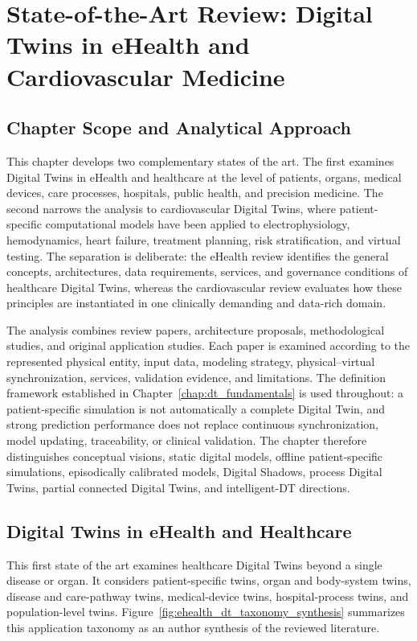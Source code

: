 \chapter{State-of-the-Art Review: Digital Twins in eHealth and Cardiovascular Medicine}

\section{Chapter Scope and Analytical Approach}
This chapter develops two complementary states of the art. The first examines Digital Twins in eHealth and healthcare at the level of patients, organs, medical devices, care processes, hospitals, public health, and precision medicine. The second narrows the analysis to cardiovascular Digital Twins, where patient-specific computational models have been applied to electrophysiology, hemodynamics, heart failure, treatment planning, risk stratification, and virtual testing. The separation is deliberate: the eHealth review identifies the general concepts, architectures, data requirements, services, and governance conditions of healthcare Digital Twins, whereas the cardiovascular review evaluates how these principles are instantiated in one clinically demanding and data-rich domain.

The analysis combines review papers, architecture proposals, methodological studies, and original application studies. Each paper is examined according to the represented physical entity, input data, modeling strategy, physical--virtual synchronization, services, validation evidence, and limitations. The definition framework established in Chapter~\ref{chap:dt_fundamentals} is used throughout: a patient-specific simulation is not automatically a complete Digital Twin, and strong prediction performance does not replace continuous synchronization, model updating, traceability, or clinical validation. The chapter therefore distinguishes conceptual visions, static digital models, offline patient-specific simulations, episodically calibrated models, Digital Shadows, process Digital Twins, partial connected Digital Twins, and intelligent-DT directions.

\section{Digital Twins in eHealth and Healthcare}
\label{sec:sota_ehealth}

This first state of the art examines healthcare Digital Twins beyond a single disease or organ. It considers patient-specific twins, organ and body-system twins, disease and care-pathway twins, medical-device twins, hospital-process twins, and population-level twins. Figure~\ref{fig:ehealth_dt_taxonomy_synthesis} summarizes this application taxonomy as an author synthesis of the reviewed literature.

